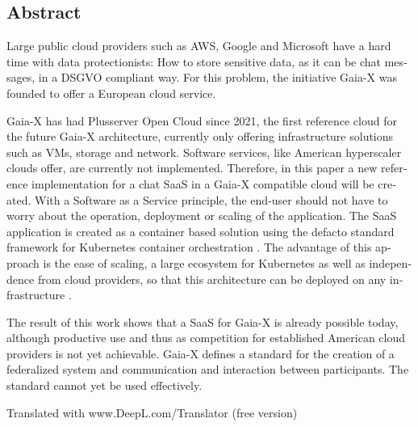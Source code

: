 

\begin{otherlanguage}{american}
	\chapter*{Abstract}
	Large public cloud providers such as AWS, Google and Microsoft have a hard time with data protectionists:
	How to store sensitive data, as it can be chat messages, in a DSGVO compliant way.
	For this problem, the initiative Gaia-X was founded to offer a European cloud service.

	Gaia-X has had Plusserver Open Cloud since 2021, the first reference cloud for the future Gaia-X architecture,
	currently only offering infrastructure solutions such as \acp{VM}, storage and network. 
	Software services, like American hyperscaler clouds offer, are currently not implemented.
	Therefore, in this paper a new reference implementation for a chat \ac{SaaS} in a Gaia-X compatible cloud will be created.
	With a Software as a Service principle, the end-user should not have to worry about the operation, deployment
	or scaling of the application. 
	The \ac{SaaS} application is created as a container based solution using the defacto standard framework for 
	Kubernetes container orchestration \cite{Burns2019}. The advantage of this approach is the ease of scaling,
	a large ecosystem for Kubernetes as well as independence from cloud providers, 
	so that this architecture can be deployed on any infrastructure \cite{Burns2019}.

	The result of this work shows that a \ac{SaaS} for Gaia-X is already possible today, 
	although productive use and thus as competition for established American cloud providers is not yet achievable. 
	Gaia-X defines a standard for the creation of a federalized system and communication and interaction between participants. 
	The standard cannot yet be used effectively. 

Translated with www.DeepL.com/Translator (free version)
\end{otherlanguage}
